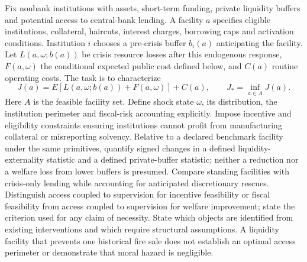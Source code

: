 \documentclass[11pt,a4paper]{article}
\begin{document}
Fix nonbank institutions with assets, short-term funding, private liquidity buffers and potential access to central-bank lending. A facility \(a\) specifies eligible institutions, collateral, haircuts, interest charges, borrowing caps and activation conditions. Institution \(i\) chooses a pre-crisis buffer \(b_i(a)\) anticipating the facility. Let \(L(a,\omega;b(a))\) be crisis resource losses after this endogenous response, \(F(a,\omega)\) the conditional expected public cost defined below, and \(C(a)\) routine operating costs. The task is to characterize
\[J(a)=E[L(a,\omega;b(a))+F(a,\omega)]+C(a),\qquad J_*=\inf_{a\in A}J(a).\]
Here \(A\) is the feasible facility set. Define shock state \(\omega\), its distribution, the institution perimeter and fiscal-risk accounting explicitly. Impose incentive and eligibility constraints ensuring institutions cannot profit from manufacturing collateral or misreporting solvency. Relative to a declared benchmark facility under the same primitives, quantify signed changes in a defined liquidity-externality statistic and a defined private-buffer statistic; neither a reduction nor a welfare loss from lower buffers is presumed. Compare standing facilities with crisis-only lending while accounting for anticipated discretionary rescues. Distinguish access coupled to supervision for incentive feasibility or fiscal feasibility from access coupled to supervision for welfare improvement; state the criterion used for any claim of necessity. State which objects are identified from existing interventions and which require structural assumptions. A liquidity facility that prevents one historical fire sale does not establish an optimal access perimeter or demonstrate that moral hazard is negligible.
\end{document}
